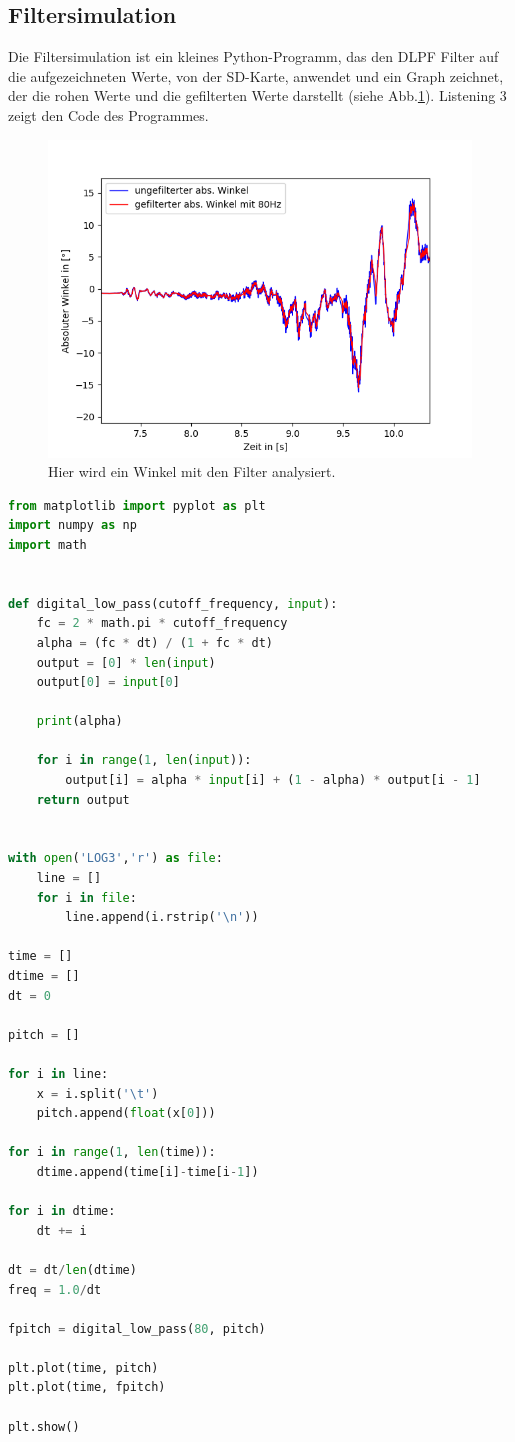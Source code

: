 \documentclass[12pt,a4paper, ngerman]{article}
\begin{document}
\subsection{Filtersimulation}
Die Filtersimulation ist ein kleines Python-Programm, das den DLPF Filter auf die aufgezeichneten Werte, von der SD-Karte, anwendet und ein Graph zeichnet, der die rohen Werte und die gefilterten Werte darstellt (siehe Abb.\ref{list}). Listening 3 zeigt den Code des Programmes. 
\begin{figure}[h]
\centering
\includegraphics[width=\textwidth]{Figure_1.png}
\caption[Eigenes Bild]{Hier wird ein Winkel mit den Filter analysiert.}\label{list}
\end{figure}
\begin{lstlisting}[language=Python,caption=Filtersimulation]
from matplotlib import pyplot as plt
import numpy as np
import math


def digital_low_pass(cutoff_frequency, input):
    fc = 2 * math.pi * cutoff_frequency
    alpha = (fc * dt) / (1 + fc * dt)
    output = [0] * len(input)
    output[0] = input[0]

    print(alpha)

    for i in range(1, len(input)):
        output[i] = alpha * input[i] + (1 - alpha) * output[i - 1]
    return output


with open('LOG3','r') as file:
    line = []
    for i in file:
        line.append(i.rstrip('\n'))

time = []
dtime = []
dt = 0

pitch = []

for i in line:
    x = i.split('\t')
    pitch.append(float(x[0]))

for i in range(1, len(time)):
    dtime.append(time[i]-time[i-1])

for i in dtime:
    dt += i

dt = dt/len(dtime)
freq = 1.0/dt

fpitch = digital_low_pass(80, pitch)

plt.plot(time, pitch)
plt.plot(time, fpitch)

plt.show()
\end{lstlisting}
\newpage
\end{document}
